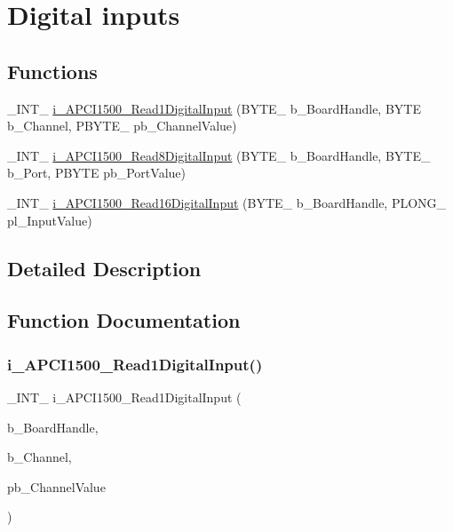 \hypertarget{group___dig_inp_cmp_d_l_l}{}\section{Digital inputs}
\label{group___dig_inp_cmp_d_l_l}
\subsection*{Functions}
\begin{DoxyCompactItemize}
\item 
\+\_\+\+I\+N\+T\+\_\+ \mbox{\hyperlink{group___dig_inp_cmp_d_l_l_ga10694390c9c944cb6122847898245d1a}{i\+\_\+\+A\+P\+C\+I1500\+\_\+\+Read1\+Digital\+Input}} (B\+Y\+T\+E\+\_\+ b\+\_\+\+Board\+Handle, B\+Y\+TE b\+\_\+\+Channel, P\+B\+Y\+T\+E\+\_\+ pb\+\_\+\+Channel\+Value)
\item 
\+\_\+\+I\+N\+T\+\_\+ \mbox{\hyperlink{group___dig_inp_cmp_d_l_l_ga380030abf1d218bfec0322368b8be59c}{i\+\_\+\+A\+P\+C\+I1500\+\_\+\+Read8\+Digital\+Input}} (B\+Y\+T\+E\+\_\+ b\+\_\+\+Board\+Handle, B\+Y\+T\+E\+\_\+ b\+\_\+\+Port, P\+B\+Y\+TE pb\+\_\+\+Port\+Value)
\item 
\+\_\+\+I\+N\+T\+\_\+ \mbox{\hyperlink{group___dig_inp_cmp_d_l_l_ga346323c601e2ec09a00266986080f870}{i\+\_\+\+A\+P\+C\+I1500\+\_\+\+Read16\+Digital\+Input}} (B\+Y\+T\+E\+\_\+ b\+\_\+\+Board\+Handle, P\+L\+O\+N\+G\+\_\+ pl\+\_\+\+Input\+Value)
\end{DoxyCompactItemize}


\subsection{Detailed Description}


\subsection{Function Documentation}
\mbox{\label{group___dig_inp_cmp_d_l_l_ga10694390c9c944cb6122847898245d1a}} 
\subsubsection{\texorpdfstring{i\_APCI1500\_Read1DigitalInput()}{i\_APCI1500\_Read1DigitalInput()}}
{\footnotesize\ttfamily \+\_\+\+I\+N\+T\+\_\+ i\+\_\+\+A\+P\+C\+I1500\+\_\+\+Read1\+Digital\+Input (\begin{DoxyParamCaption}\item[{B\+Y\+T\+E\+\_\+}]{b\+\_\+\+Board\+Handle,  }\item[{B\+Y\+TE}]{b\+\_\+\+Channel,  }\item[{P\+B\+Y\+T\+E\+\_\+}]{pb\+\_\+\+Channel\+Value }\end{DoxyParamCaption})}

